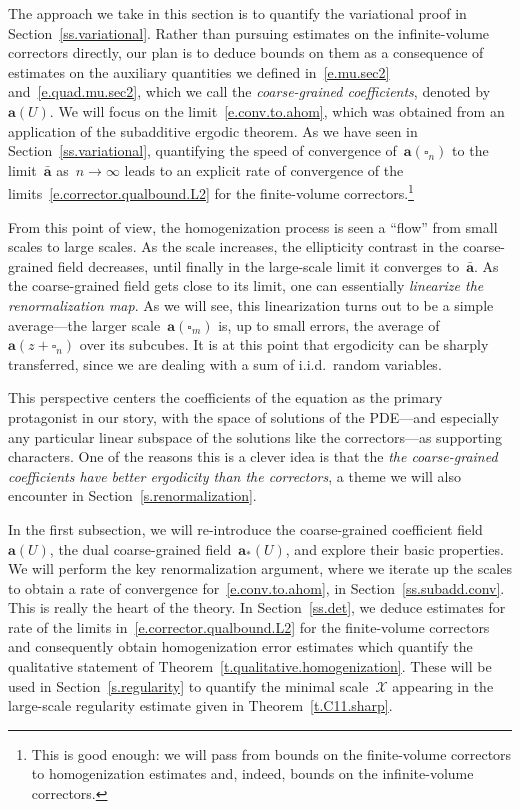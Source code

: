 \documentclass[11pt]{article} %
\let\oldsquare\square %
\renewcommand{\square}{\oldsquare}
\numberwithin{equation}{section}
\theoremstyle{definition}
\renewcommand{\a}{\mathbf{a}}
\newcommand{\ahom}{\bar{\a}}
\newcommand{\cu}{\square}
\newcommand{\X}{\mathcal{X}}
\begin{document}
The approach we take in this section is to quantify the variational proof in Section~\ref{ss.variational}. 
Rather than pursuing estimates on the infinite-volume correctors directly, our plan is to deduce bounds on them as a consequence of estimates on the auxiliary quantities we defined in~\eqref{e.mu.sec2} and~\eqref{e.quad.mu.sec2}, which we call the \emph{coarse-grained coefficients}, denoted by~$\a(U)$. 
We will focus on the limit~\eqref{e.conv.to.ahom}, which was obtained from an application of the subadditive ergodic theorem. 
As we have seen in Section~\ref{ss.variational}, quantifying the speed of convergence of~$\a(\cu_n)$ to the limit~$\ahom$ as~$n\to \infty$ leads to an explicit rate of convergence of the limits~\eqref{e.corrector.qualbound.L2} for the finite-volume correctors.\footnote{This is good enough: we will pass from bounds on the finite-volume correctors to homogenization estimates and, indeed, bounds on the infinite-volume correctors.}

\smallskip

From this point of view, the homogenization process is seen a ``flow'' from small scales to large scales. As the scale increases, the ellipticity contrast in the coarse-grained field decreases, until finally in the large-scale limit it converges to~$\ahom$. 
As the coarse-grained field gets close to its limit, one can essentially \emph{linearize the renormalization map}. As we will see, this linearization turns out to be a simple average---the larger scale~$\a(\cu_m)$ is, up to small errors, the average of~$\a(z+\cu_n)$ over its subcubes. It is at this point that ergodicity can be sharply transferred, since we are dealing with a sum of i.i.d.~random variables. 

\smallskip

This perspective centers the coefficients of the equation as the primary protagonist in our story, with the space of solutions of the PDE---and especially any particular linear subspace of the solutions like the correctors---as supporting characters. One of the reasons this is a clever idea is that the \emph{the coarse-grained coefficients have better ergodicity than the correctors}, a theme we will also encounter in Section~\ref{s.renormalization}. 

\smallskip

In the first subsection, we will re-introduce the coarse-grained coefficient field~$\a(U)$, the dual coarse-grained field~$\a_*(U)$, and explore their basic properties. We will perform the key renormalization argument, where we iterate up the scales to obtain a rate of convergence for~\eqref{e.conv.to.ahom}, in Section~\ref{ss.subadd.conv}. This is really the heart of the theory. 
In Section~\ref{ss.det}, we deduce estimates for rate of the limits in~\eqref{e.corrector.qualbound.L2} for the finite-volume correctors and consequently obtain homogenization error estimates which quantify the qualitative statement of Theorem~\ref{t.qualitative.homogenization}. These will be used in Section~\ref{s.regularity} to quantify the minimal scale~$\X$ appearing in the large-scale regularity estimate given in Theorem~\ref{t.C11.sharp}. 
\end{document}
